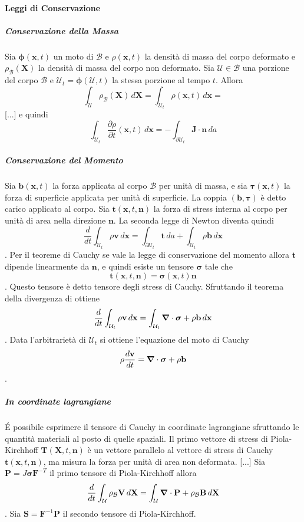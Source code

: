 \paragraph{Leggi di Conservazione}
\subparagraph{Conservazione della Massa}
Sia $\boldsymbol{\phi}(\mathbf{x},t)$ un moto di $\mathcal{B}$ e $\rho(\mathbf{x},t)$ la densità di massa del corpo deformato e $\rho_{\mathcal{B}}(\mathbf{X})$ la densità di massa del corpo non deformato. 
Sia $\mathcal{U}\in\mathcal{B}$ una porzione del corpo $\mathcal{B}$ e  $\mathcal{U}_t=\boldsymbol{\phi}(\mathcal{U},t)$ la stessa porzione al tempo $t$. Allora 
$$\int_{\mathcal{U}}\rho_{\mathcal{B}}(\mathbf{X})\, d\mathbf{X} = \int_{\mathcal{U}_t}\rho(\mathbf{x},t)\, d\mathbf{x} = $$
[...] e quindi
$$\int_{\mathcal{U}_t}\frac{\partial\rho}{\partial t}(\mathbf{x},t)\, d\mathbf{x} =  -\int_{\partial\mathcal{U}_t} \mathbf{J} \cdot \mathbf{n} \, da$$
\subparagraph{Conservazione del Momento}
Sia $\mathbf{b}(\mathbf{x},t)$ la forza applicata al corpo $\mathcal{B}$ per unità di massa, e sia $\boldsymbol{\tau}(\mathbf{x},t)$ la forza di superficie applicata per unità di superficie. La coppia $(\mathbf{b},\boldsymbol{\tau})$ è detto carico applicato al corpo. Sia $\mathbf{t}(\mathbf{x},t,\mathbf{n})$ la forza di stress interna al corpo per unità di area nella direzione $\mathbf{n}$. La seconda legge di Newton diventa quindi
$$\frac{d}{dt}\int_{\mathcal{U}_t}\rho\mathbf{v}\, d\mathbf{x} = \int_{\partial \mathcal{U}_t}\mathbf{t}\, da + \int_{\mathcal{U}_t}\rho\mathbf{b}\, d\mathbf{x} $$.
Per il teoreme di Cauchy se vale la legge di conservazione del momento allora $\mathbf{t}$ dipende linearmente da  $\mathbf{n}$, e quindi esiste un tensore $\boldsymbol{\sigma}$ tale che 
$$\mathbf{t}(\mathbf{x},t,\mathbf{n})= \boldsymbol{\sigma}(\mathbf{x},t)\mathbf{n}$$. Questo tensore è detto tensore degli stress di Cauchy. Sfruttando il teorema della divergenza di ottiene
$$\frac{d}{dt}\int_{\mathcal{U}_t}\rho\mathbf{v}\, d\mathbf{x} = \int_{\mathcal{U}_t}\boldsymbol{\nabla}\cdot\boldsymbol{\sigma}+\rho\mathbf{b}\, d\mathbf{x} $$.
Data l'arbitrarietà di ${\mathcal{U}_t}$ si ottiene l'equazione del moto di Cauchy
$$\rho\frac{d\mathbf{v}}{dt}=\boldsymbol{\nabla}\cdot\boldsymbol{\sigma}+\rho\mathbf{b}$$. 
\subparagraph{In coordinate lagrangiane}
\'E possibile esprimere il tensore di Cauchy in coordinate lagrangiane sfruttando le quantità materiali al posto di quelle spaziali.
Il primo vettore di stress di Piola-Kirchhoff $\mathbf{T}(\mathbf{X},t,\mathbf{n})$ è un vettore parallelo al vettore di stress di Cauchy $\mathbf{t}(\mathbf{x},t,\mathbf{n})$, ma misura la forza per unità di area non deformata.
[...]
Sia $\mathbf{P}=J\boldsymbol{\sigma}\mathbf{F}^{-T}$ il primo tensore di Piola-Kirchhoff allora
$$\frac{d}{dt}\int_{\mathcal{U}}\rho_{\mathcal{B}}\mathbf{V}\, d\mathbf{X} = \int_\mathcal{U}\boldsymbol{\nabla}\cdot\mathbf{P}+\rho_{\mathcal{B}}\mathbf{B}\, d\mathbf{X} $$.
Sia $\mathbf{S}=\mathbf{F}^{-1}\mathbf{P}$ il secondo tensore di Piola-Kirchhoff.

